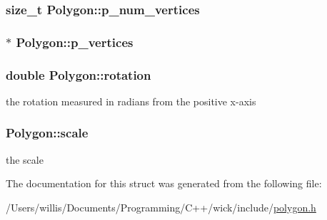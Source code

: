 \hypertarget{struct_polygon_a02f4f16a791c3b5bdf6d5a8d1050d98f}{
\subsubsection[{p\-\_\-num\-\_\-vertices}]{\setlength{\rightskip}{0pt plus 5cm}size\-\_\-t Polygon\-::p\-\_\-num\-\_\-vertices}}\label{struct_polygon_a02f4f16a791c3b5bdf6d5a8d1050d98f}
\hypertarget{struct_polygon_a96e84a65b6e342ef6b0d68d351e19ca3}{
\subsubsection[{p\-\_\-vertices}]{$\ast$ Polygon\-::p\-\_\-vertices}}\label{struct_polygon_a96e84a65b6e342ef6b0d68d351e19ca3}
\hypertarget{struct_polygon_a61a82f869dfde87b2e08f5c550b5f819}{
\subsubsection[{rotation}]{\setlength{\rightskip}{0pt plus 5cm}double Polygon\-::rotation}}\label{struct_polygon_a61a82f869dfde87b2e08f5c550b5f819}
the rotation measured in radians from the positive x-\/axis \hypertarget{struct_polygon_a5b1b549320c19673cf0355a79bde3f8f}{
\subsubsection[{scale}]{ Polygon\-::scale}}\label{struct_polygon_a5b1b549320c19673cf0355a79bde3f8f}
the scale 

The documentation for this struct was generated from the following file\-:\begin{DoxyCompactItemize}
\item 
/\-Users/willis/\-Documents/\-Programming/\-C++/wick/include/\hyperlink{polygon_8h}{polygon.\-h}\end{DoxyCompactItemize}
